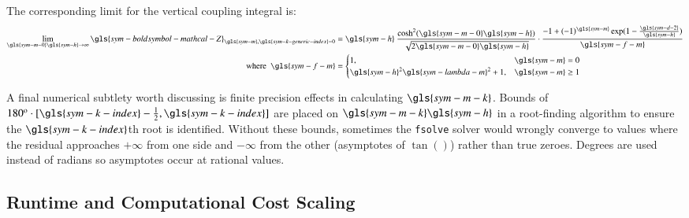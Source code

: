The corresponding limit for the vertical coupling integral is:
\begin{equation}
\begin{aligned}
    \lim_{\gls{sym-m-0}\gls{sym-h}\rightarrow\infty}
    \gls{sym-boldsymbol-mathcal-Z}_{\gls{sym-m},\gls{sym-k-generic-index}=0}
    &
    = \gls{sym-h}~\frac{
                            \cosh^2 (\gls{sym-m-0}\gls{sym-h})
                        }
                        {
                            \sqrt{2\gls{sym-m-0}\gls{sym-h}}
                        }
            \cdot \frac{
                            -1+(-1)^{\gls{sym-m}}
                            \exp(
                                1-\frac{\gls{sym-d-2}} {\gls{sym-h}}
                                )
                        }
                        {
                            \gls{sym-f-m}
                        }
    \\
    \text{where}~~\gls{sym-f-m}&=
    \begin{cases}
        1,                                   & \gls{sym-m}=0 \\
        \gls{sym-h}^2\gls{sym-lambda-m}^2+1, & \gls{sym-m} \geq 1
    \end{cases}
\end{aligned}
\end{equation}

A final numerical subtlety worth discussing is finite precision effects in calculating $\gls{sym-m-k}$.
Bounds of $180^\textrm{o}\cdot[\gls{sym-k-index}-\frac{1}{2}, \gls{sym-k-index}]$
are placed on $\gls{sym-m-k}\gls{sym-h}$ in a root-finding algorithm to ensure the $\gls{sym-k-index}$th root is identified.
Without these bounds, sometimes the \texttt{fsolve} solver would wrongly converge to values where the residual approaches
$+\infty$ from one side and $-\infty$ from the other
(asymptotes of $\tan()$) rather than true zeroes.
Degrees are used instead of radians so asymptotes occur at rational values.

\subsection{Runtime and Computational Cost Scaling}

